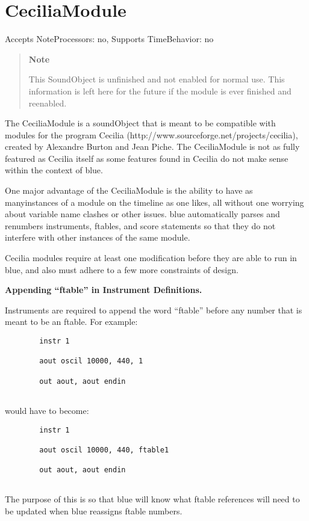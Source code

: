 \section{CeciliaModule}\label{ceciliaModule}

Accepts NoteProcessors: no, Supports TimeBehavior: no

\begin{quote}
\textbf{Note}

This SoundObject is unfinished and not enabled for normal use. This
information is left here for the future if the module is ever finished
and reenabled.
\end{quote}

The CeciliaModule is a soundObject that is meant to be compatible with
modules for the program Cecilia
(http://www.sourceforge.net/projects/cecilia), created by Alexandre
Burton and Jean Piche. The CeciliaModule is not as fully featured as
Cecilia itself as some features found in Cecilia do not make sense
within the context of blue.

One major advantage of the CeciliaModule is the ability to have as
manyinstances of a module on the timeline as one likes, all without one
worrying about variable name clashes or other issues. blue automatically
parses and renumbers instruments, ftables, and score statements so that
they do not interfere with other instances of the same module.

Cecilia modules require at least one modification before they are able
to run in blue, and also must adhere to a few more constraints of
design.

\textbf{Appending ``ftable'' in Instrument Definitions.}

Instruments are required to append the word ``ftable'' before any number
that is meant to be an ftable. For example:

\begin{verbatim}
        instr 1

        aout oscil 10000, 440, 1

        out aout, aout endin
      
\end{verbatim}

would have to become:

\begin{verbatim}
        instr 1

        aout oscil 10000, 440, ftable1

        out aout, aout endin
      
\end{verbatim}

The purpose of this is so that blue will know what ftable references
will need to be updated when blue reassigns ftable numbers.
